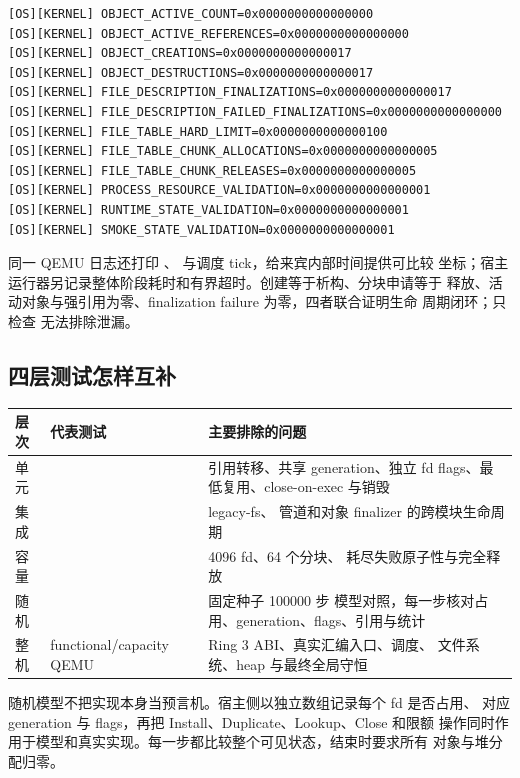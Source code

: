 \begin{lstlisting}[caption={v1.4 functional 运行的代表性对象证据}]
[OS][KERNEL] OBJECT_ACTIVE_COUNT=0x0000000000000000
[OS][KERNEL] OBJECT_ACTIVE_REFERENCES=0x0000000000000000
[OS][KERNEL] OBJECT_CREATIONS=0x0000000000000017
[OS][KERNEL] OBJECT_DESTRUCTIONS=0x0000000000000017
[OS][KERNEL] FILE_DESCRIPTION_FINALIZATIONS=0x0000000000000017
[OS][KERNEL] FILE_DESCRIPTION_FAILED_FINALIZATIONS=0x0000000000000000
[OS][KERNEL] FILE_TABLE_HARD_LIMIT=0x0000000000000100
[OS][KERNEL] FILE_TABLE_CHUNK_ALLOCATIONS=0x0000000000000005
[OS][KERNEL] FILE_TABLE_CHUNK_RELEASES=0x0000000000000005
[OS][KERNEL] PROCESS_RESOURCE_VALIDATION=0x0000000000000001
[OS][KERNEL] RUNTIME_STATE_VALIDATION=0x0000000000000001
[OS][KERNEL] SMOKE_STATE_VALIDATION=0x0000000000000001
\end{lstlisting}

同一 QEMU 日志还打印 、
 与调度 tick，给来宾内部时间提供可比较
坐标；宿主运行器另记录整体阶段耗时和有界超时。创建等于析构、分块申请等于
释放、活动对象与强引用为零、finalization failure 为零，四者联合证明生命
周期闭环；只检查  无法排除泄漏。

\subsection{四层测试怎样互补}

\begin{longtable}{L{0.25\textwidth}L{0.28\textwidth}L{0.35\textwidth}}
\toprule
层次 & 代表测试 & 主要排除的问题\\
\midrule
单元 &  & 引用转移、共享 generation、独立
fd flags、最低复用、close-on-exec 与销毁\\
集成 &  & legacy-fs、
管道和对象 finalizer 的跨模块生命周期\\
容量 &  & 4096 fd、64 个分块、
耗尽失败原子性与完全释放\\
随机 &  & 固定种子 100000 步
模型对照，每一步核对占用、generation、flags、引用与统计\\
整机 & functional/capacity QEMU & Ring 3 ABI、真实汇编入口、调度、
文件系统、heap 与最终全局守恒\\
\bottomrule
\end{longtable}

随机模型不把实现本身当预言机。宿主侧以独立数组记录每个 fd 是否占用、
对应 generation 与 flags，再把 Install、Duplicate、Lookup、Close 和限额
操作同时作用于模型和真实实现。每一步都比较整个可见状态，结束时要求所有
对象与堆分配归零。

